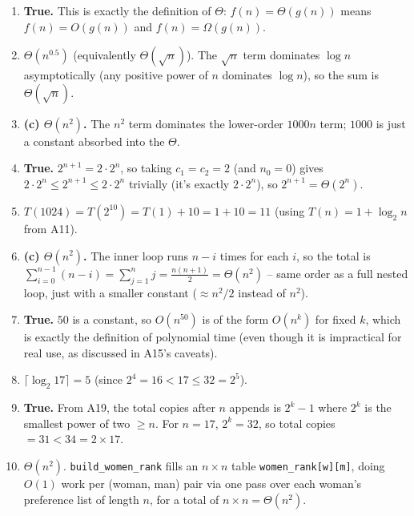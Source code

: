 \documentclass[11pt]{article}
\begin{document}
\begin{enumerate}[label=\textbf{B\arabic*.}, leftmargin=2.2em]

\item \textbf{True.} This is exactly the definition of $\Theta$: $f(n)=\Theta(g(n))$ means
$f(n)=O(g(n))$ and $f(n)=\Omega(g(n))$.

\item $\Theta(n^{0.5})$ (equivalently $\Theta(\sqrt{n})$). The $\sqrt{n}$ term dominates
$\log n$ asymptotically (any positive power of $n$ dominates $\log n$), so the sum is
$\Theta(\sqrt{n})$.

\item \textbf{(c) $\Theta(n^2)$.} The $n^2$ term dominates the lower-order $1000n$ term;
$1000$ is just a constant absorbed into the $\Theta$.

\item \textbf{True.} $2^{n+1} = 2 \cdot 2^n$, so taking $c_1=c_2=2$ (and $n_0=0$) gives $2
\cdot 2^n \le 2^{n+1} \le 2 \cdot 2^n$ trivially (it's exactly $2\cdot 2^n$), so $2^{n+1} =
\Theta(2^n)$.

\item $T(1024) = T(2^{10}) = T(1) + 10 = 1 + 10 = 11$ (using $T(n) = 1 + \log_2 n$ from
A11).

\item \textbf{(c) $\Theta(n^2)$.} The inner loop runs $n-i$ times for each $i$, so the
total is $\sum_{i=0}^{n-1}(n-i) = \sum_{j=1}^{n} j = \frac{n(n+1)}{2} = \Theta(n^2)$ --
same order as a full nested loop, just with a smaller constant ($\approx n^2/2$ instead of
$n^2$).

\item \textbf{True.} $50$ is a constant, so $O(n^{50})$ is of the form $O(n^k)$ for fixed
$k$, which is exactly the definition of polynomial time (even though it is impractical for
real use, as discussed in A15's caveats).

\item $\lceil \log_2 17 \rceil = 5$ (since $2^4=16 < 17 \le 32 = 2^5$).

\item \textbf{True.} From A19, the total copies after $n$ appends is $2^k - 1$ where $2^k$
is the smallest power of two $\ge n$. For $n=17$, $2^k = 32$, so total copies $= 31 < 34 =
2 \times 17$.

\item $\Theta(n^2)$. \texttt{build\_women\_rank} fills an $n \times n$ table
\texttt{women\_rank[w][m]}, doing $O(1)$ work per (woman, man) pair via one pass over each
woman's preference list of length $n$, for a total of $n \times n = \Theta(n^2)$.

\end{enumerate}
\end{document}
